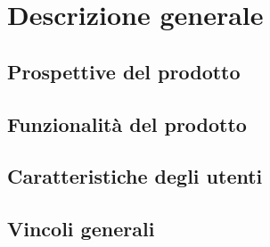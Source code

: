 \section{Descrizione generale}
\subsection{Prospettive del prodotto}
\subsection{Funzionalità del prodotto}
\subsection{Caratteristiche degli utenti}
\subsection{Vincoli generali}